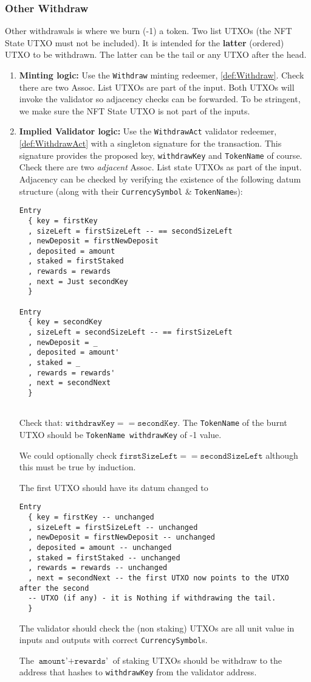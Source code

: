 \documentclass[10pt, a4paper]{article}
\theoremstyle{definition}
\begin{document}
\subsubsection{Other Withdraw}\label{subsubsection:OtherWithdraw}
Other withdrawals is where we burn (-1) a token. Two list UTXOs (the NFT State UTXO must not be included). It is intended for the \textbf{latter} (ordered) UTXO to be withdrawn. The latter can be the tail or any UTXO after the head.
\begin{enumerate}
\item{\textbf{Minting logic:} Use the \texttt{Withdraw} minting redeemer, \ref{def:Withdraw}. Check there are two Assoc. List UTXOs are part of the input. Both UTXOs will invoke the validator so adjacency checks can be forwarded. To be stringent, we make sure the NFT State UTXO is not part of the inputs.
}

\item{\textbf{Implied Validator logic:} Use the \texttt{WithdrawAct} validator redeemer, \ref{def:WithdrawAct} with a singleton signature for the transaction. This signature provides the proposed key, \texttt{withdrawKey} and \texttt{TokenName} of course. Check there are two \textit{adjacent} Assoc. List state UTXOs as part of the input. Adjacency can be checked by verifying the existence of the following datum structure (along with their \texttt{CurrencySymbol} \& \texttt{TokenName}s):
\begin{verbatim}
Entry
  { key = firstKey
  , sizeLeft = firstSizeLeft -- == secondSizeLeft
  , newDeposit = firstNewDeposit
  , deposited = amount
  , staked = firstStaked
  , rewards = rewards
  , next = Just secondKey
  }
  
Entry
  { key = secondKey
  , sizeLeft = secondSizeLeft -- == firstSizeLeft
  , newDeposit = _
  , deposited = amount'
  , staked = _
  , rewards = rewards'
  , next = secondNext
  }
   
\end{verbatim}

Check that: $\texttt{withdrawKey} == \texttt{secondKey}.$ The \texttt{TokenName} of the burnt UTXO should be \texttt{TokenName withdrawKey} of -1 value.

We could optionally check $\texttt{firstSizeLeft} == \texttt{secondSizeLeft}$ although this must be true by induction.

The first UTXO should have its datum changed to \begin{verbatim}
Entry
  { key = firstKey -- unchanged
  , sizeLeft = firstSizeLeft -- unchanged
  , newDeposit = firstNewDeposit -- unchanged
  , deposited = amount -- unchanged
  , staked = firstStaked -- unchanged
  , rewards = rewards -- unchanged
  , next = secondNext -- the first UTXO now points to the UTXO after the second
  -- UTXO (if any) - it is Nothing if withdrawing the tail.
  }
\end{verbatim}

The validator should check the (non staking) UTXOs are all unit value in inputs and outputs with correct \texttt{CurrencySymbol}s.

The $\texttt{amount'} + \texttt{rewards'}$ of staking UTXOs should be withdraw to the address that hashes to \texttt{withdrawKey} from the validator address.
}
\end{enumerate}
\end{document}
